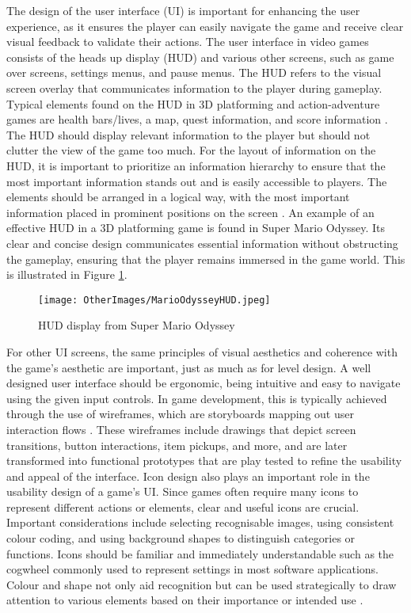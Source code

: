 \documentclass[10pt]{final_report}
\begin{document}
The design of the user interface (UI) is important for enhancing the user experience, as it ensures the player can easily navigate the game and receive clear visual feedback to validate their actions. The user interface in video games consists of the heads up display (HUD) and various other screens, such as game over screens, settings menus, and pause menus. The HUD refers to the visual screen overlay that communicates information to the player during gameplay. Typical elements found on the HUD in 3D platforming and action-adventure games are health bars/lives, a map, quest information, and score information \cite{Rogers2014}. The HUD should display relevant information to the player but should not clutter the view of the game too much. For the layout of information on the HUD, it is important to prioritize an information hierarchy to ensure that the most important information stands out and is easily accessible to players. The elements should be arranged in a logical way, with the most important information placed in prominent positions on the screen \cite{Hive}. An example of an effective HUD in a 3D platforming game is found in Super Mario Odyssey. Its clear and concise design communicates essential information without obstructing the gameplay, ensuring that the player remains immersed in the game world. This is illustrated in Figure \ref{fig:MarioHUD}.
\begin{figure}[H]
    \centering
    \texttt{[image: OtherImages/MarioOdysseyHUD.jpeg]}
    \caption{HUD display from Super Mario Odyssey}
    \label{fig:MarioHUD}
\end{figure}

For other UI screens, the same principles of visual aesthetics and coherence with the game’s aesthetic are important, just as much as for level design. A well designed user interface should be ergonomic, being intuitive and easy to navigate using the given input controls. In game development, this is typically achieved through the use of wireframes, which are storyboards mapping out user interaction flows \cite{Rogers2014}. These wireframes include drawings that depict screen transitions, button interactions, item pickups, and more, and are later transformed into functional prototypes that are play tested to refine the usability and appeal of the interface.\newline
Icon design also plays an important role in the usability design of a game's UI. Since games often require many icons to represent different actions or elements, clear and useful icons are crucial. Important considerations include selecting recognisable images, using consistent colour coding, and using background shapes to distinguish categories or functions. Icons should be familiar and immediately understandable such as the cogwheel commonly used to represent settings in most software applications. Colour and shape not only aid recognition but can be used strategically to draw attention to various elements based on their importance or intended use \cite{Rogers2014}.
\end{document}
